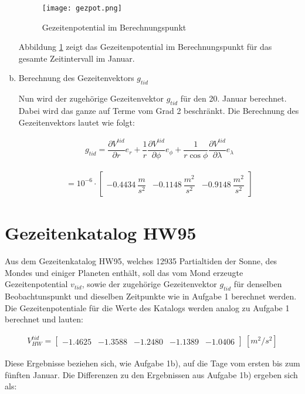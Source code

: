 \begin{enumerate}[a)]
\begin{figure}[H]
\centering
\texttt{[image: gezpot.png]}
\caption{Gezeitenpotential im Berechnungspunkt}
\label{gezpot}
\end{figure}

Abbildung \ref{gezpot} zeigt das Gezeitenpotential im Berechnungspunkt für das gesamte Zeitintervall im Januar. 

\item Berechnung des Gezeitenvektors $g_{tid}$

Nun wird der zugehörige Gezeitenvektor $g_{tid}$ für den 20. Januar berechnet. Dabei wird das ganze auf Terme vom Grad 2 beschränkt. Die Berechnung des Gezeitenvektors lautet wie folgt: 

\begin{gather}
g_{tid} = \dfrac{\partial V^{tid}}{\partial r} e_r + \dfrac{1}{r} \dfrac{\partial V^{tid}}{\partial \phi} e_{\phi} + \dfrac{1}{r \cos \phi} \dfrac{\partial V^{tid}}{\partial \lambda} e_{\lambda}
\end{gather}

\begin{gather*}
= 10^{-6} \cdot \begin{bmatrix}
-0.4434 ~\dfrac{m}{s^2} &-0.1148 ~\dfrac{m^2}{s^2} &-0.9148 ~\dfrac{m^2}{s^2}
\end{bmatrix}
\end{gather*}
\end{enumerate}

\section{Gezeitenkatalog HW95}

Aus dem Gezeitenkatalog HW95, welches 12935 Partialtiden der Sonne, des Mondes und einiger Planeten enthält, soll das vom Mond erzeugte Gezeitenpotential $v_{tid}$, sowie der zugehörige Gezeitenvektor $g_{tid}$ für denselben Beobachtunspunkt und dieselben Zeitpunkte wie in Aufgabe 1 berechnet werden. Die Gezeitenpotentiale für die Werte des Katalogs werden analog zu Aufgabe 1 berechnet und lauten: 

\begin{gather*}
V_{HW}^{tid} = \begin{bmatrix}
-1.4625 &-1.3588& -1.2480&-1.1389&-1.0406
\end{bmatrix}~[m^2/s^2]
\end{gather*}

Diese Ergebnisse beziehen sich, wie Aufgabe 1b), auf die Tage vom ersten bis zum fünften Januar. Die Differenzen zu den Ergebnissen aus Aufgabe 1b) ergeben sich als: 

